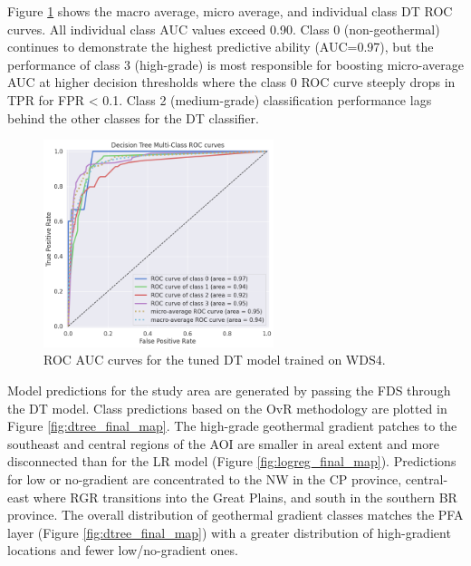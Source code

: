 Figure \ref{fig:dtree_auc} shows the macro average, micro average, and individual class DT ROC curves. All individual class AUC values exceed 0.90. Class 0 (non-geothermal) continues to demonstrate the highest predictive ability (AUC=0.97), but the performance of class 3 (high-grade) is most responsible for boosting micro-average AUC at higher decision thresholds where the class 0 ROC curve steeply drops in TPR for FPR < 0.1. Class 2 (medium-grade) classification performance lags behind the other classes for the DT classifier.

\begin{figure}[!htp]
\centering
\includegraphics[width=0.6\textwidth]{templates/images/Figure-DT_AUC.png}
\caption[Decision tree AUC curves]{ROC AUC curves for the tuned DT model trained on WDS4.}
\label{fig:dtree_auc}
\end{figure}

Model predictions for the study area are generated by passing the FDS through the DT model. Class predictions based on the OvR methodology are plotted in Figure \ref{fig:dtree_final_map}. The high-grade geothermal gradient patches to the southeast and central regions of the AOI are smaller in areal extent and more disconnected than for the LR model (Figure \ref{fig:logreg_final_map}). Predictions for low or no-gradient are concentrated to the NW in the CP province, central-east where RGR transitions into the Great Plains, and south in the southern BR province. The overall distribution of geothermal gradient classes matches the \citet{bielicki_hydrogeolgic_2015} PFA layer (Figure \ref{fig:dtree_final_map}) with a greater distribution of high-gradient locations and fewer low/no-gradient ones.

